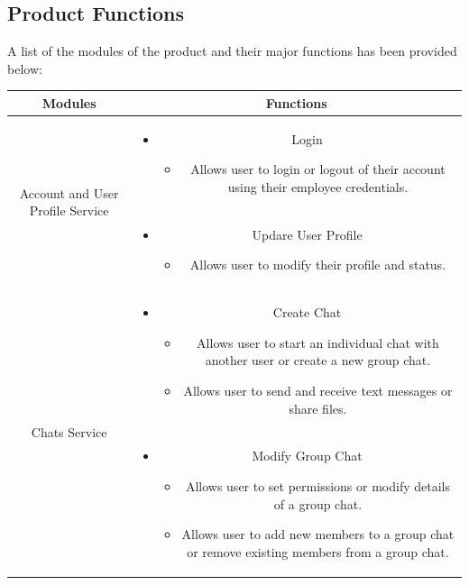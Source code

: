 \documentclass[]{article}
\begin{document}
\subsection{Product Functions}
\label{sub:product_functions}
A list of the modules of the product and their major functions has been provided below:
\begin{center}
\begin{tabular}{ |c|c| } 
\hline
\textbf{Modules} & \textbf{Functions} \\
\hline
\multirow{2}{*}{Account and User Profile Service} & \begin{itemize} \item Login \begin{itemize} \item Allows user to login or logout of their account using their employee credentials. \end{itemize} \end{itemize}\\
& \begin{itemize} \item Updare User Profile \begin{itemize} \item Allows user to modify their profile and status. \end{itemize} \end{itemize}\\
\hline
\multirow{4}{*}{Chats Service} & \begin{itemize} \item Create Chat \begin{itemize} \item Allows user to start an  individual chat with another user or create a new group chat. \item Allows user to send and receive text messages or share files. \end{itemize} \end{itemize}\\
& \begin{itemize} \item Modify Group Chat \begin{itemize} \item Allows user to set permissions or modify details of a group chat. \item Allows user to add new members to a group chat or remove existing members from a group chat. \end{itemize} \end{itemize} \\

\end{tabular}
\end{center}
\end{document}
